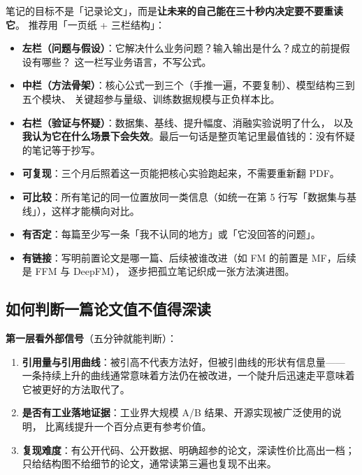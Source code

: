 笔记的目标不是「记录论文」，而是\textbf{让未来的自己能在三十秒内决定要不要重读它}。
推荐用「一页纸 + 三栏结构」：

\begin{itemize}
  \item \textbf{左栏（问题与假设）}：它解决什么业务问题？输入输出是什么？成立的前提假设有哪些？
        这一栏写业务语言，不写公式。
  \item \textbf{中栏（方法骨架）}：核心公式一到三个（手推一遍，不要复制）、模型结构三到五个模块、
        关键超参与量级、训练数据规模与正负样本比。
  \item \textbf{右栏（验证与怀疑）}：数据集、基线、提升幅度、消融实验说明了什么，
        以及\textbf{我认为它在什么场景下会失效}。最后一句话是整页笔记里最值钱的：没有怀疑的笔记等于抄写。
\end{itemize}

\begin{keypoint}[好笔记的四条硬标准]
\begin{itemize}
  \item \textbf{可复现}：三个月后照着这一页能把核心实验跑起来，不需要重新翻 PDF。
  \item \textbf{可比较}：所有笔记的同一位置放同一类信息（如统一在第 5 行写「数据集与基线」），这样才能横向对比。
  \item \textbf{有否定}：每篇至少写一条「我不认同的地方」或「它没回答的问题」。
  \item \textbf{有链接}：写明前置论文是哪一篇、后续被谁改进（如 FM 的前置是 MF，后续是 FFM 与 DeepFM），
        逐步把孤立笔记织成一张方法演进图。
\end{itemize}
\end{keypoint}

\subsection{如何判断一篇论文值不值得深读}

\textbf{第一层看外部信号}（五分钟就能判断）：

\begin{enumerate}
  \item \textbf{引用量与引用曲线}：被引高不代表方法好，但被引曲线的形状有信息量——
        一条持续上升的曲线通常意味着方法仍在被改进，一个陡升后迅速走平意味着它被更好的方法取代了。
  \item \textbf{是否有工业落地证据}：工业界大规模 A/B 结果、开源实现被广泛使用的说明，
        比离线提升一个百分点更有参考价值。
  \item \textbf{复现难度}：有公开代码、公开数据、明确超参的论文，深读性价比高出一档；
        只给结构图不给细节的论文，通常读第三遍也复现不出来。
\end{enumerate}

